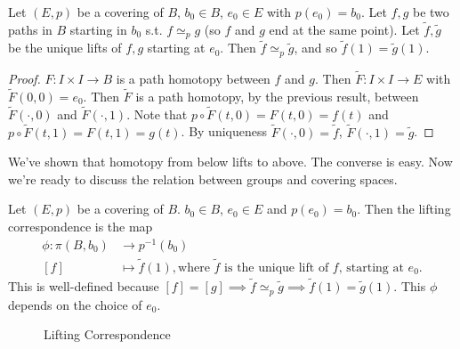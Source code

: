 \begin{theorem}[54.3]
    Let $(E, p)$ be a covering of $B$, $b_0 \in B$, $e_0 \in E$ with $p(e_0) = b_0$.
    Let $f, g$ be two paths in $B$ starting in $b_0$ s.t. $f \simeq_p  g$ (so $f$ and $g$ end at the same point).
    Let $\tilde f, \tilde g$ be the unique lifts of $f, g$ starting at $e_0$.
    Then $\tilde f \simeq_p  \tilde g$, and so $\tilde f(1) = \tilde g(1)$.
\end{theorem}
\begin{proof}
    $F: I\times I \to  B$ is a path homotopy between $f$ and $g$.
    Then $\tilde F: I \times I \to  E$ with $\tilde F( 0, 0) = e_0$.
    Then $\tilde F$ is a path homotopy, by the previous result, between $\tilde F(\cdot , 0)$ and $\tilde F(\cdot , 1)$.
    Note that $p  \circ  \tilde F(t, 0) = F(t, 0) = f(t)$ and $p  \circ  \tilde F (t, 1) = F(t, 1) = g(t)$.
    By uniqueness $\tilde F(\cdot, 0) = \tilde f$, $\tilde F(\cdot , 1) = \tilde g$.

\end{proof}


We've shown that homotopy from below lifts to above.  The converse is easy.
Now we're ready to discuss the relation between groups and covering spaces.

\begin{definition}
    Let $(E, p)$ be a covering of $B$. $b_0 \in B$, $e_0 \in E$ and $p(e_0) = b_0$.
    Then the lifting correspondence is the map  
    \begin{align*}
        \phi: \pi(B, b_0) &\longrightarrow p^{-1}(b_0) \\
        [f]&\longmapsto \tilde f(1), \text{where $\tilde f$ is the unique lift of $f$, starting at $e_0$}
    .\end{align*}
    This is well-defined because $[f] = [g] \implies \tilde f \simeq_p  \tilde g \implies \tilde f(1) = \tilde g(1)$.
    This $\phi$ depends on the choice of $e_0$.
\end{definition}

\begin{figure}[ht]
    \centering
    \caption{Lifting Correspondence}
    \label{fig:lifting-correspondence}
\end{figure}

